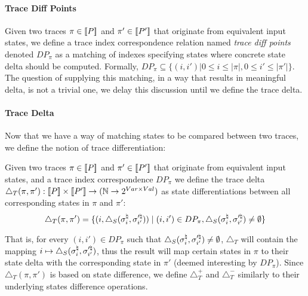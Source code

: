 
\paragraph{Trace Diff Points} 
Given two traces $\pi \in \lbrack\!\lbrack P \rbrack\!\rbrack$ and $\pi' \in \lbrack\!\lbrack P' \rbrack\!\rbrack$ that originate from equivalent input states, we define a trace index correspondence relation named \emph{trace diff points} denoted $DP_{\pi}$ as a matching of indexes specifying states where concrete state delta should be computed. Formally,
$DP_{\pi} \subseteq \{(i,i')| 0 \leq i \leq |\pi|, 0 \leq i' \leq |\pi'|\}$. The question of supplying this matching, in a way that results in meaningful delta, is not a trivial one, we delay this discussion until we define the trace delta.

\paragraph{Trace Delta}
Now that we have a way of matching states to be compared between two traces, we define the notion of trace differentiation:
\begin{definition}
Given two traces $\pi \in \lbrack\!\lbrack P \rbrack\!\rbrack$ and $\pi' \in \lbrack\!\lbrack P' \rbrack\!\rbrack$ that originate from equivalent input states, and a trace index correspondence $DP_{\pi}$ we define the trace delta $\triangle_{T}(\pi,\pi') : \lbrack\!\lbrack P \rbrack\!\rbrack \times \lbrack\!\lbrack P' \rbrack\!\rbrack \rightarrow (\mathbb{N} \rightarrow 2^{Var \times Val})$ as state differentiations between all corresponding states in $\pi$ and $\pi'$:
\[
\triangle_{T}(\pi,\pi') = \{ (i,\triangle_{S}(\sigma^\natural_{i},\sigma'^\natural_{i'})) \mid (i,i') \in DP_{\pi}, \triangle_{S}(\sigma^\natural_{i},\sigma'^\natural_{i'}) \neq \emptyset \}
\]
\end{definition}
That is, for every $(i,i') \in DP_{\pi}$ such that $\triangle_{S}(\sigma^\natural_{i},\sigma'^\natural_{i'}) \neq \emptyset$, $\triangle_{T}$ will contain the mapping $i \mapsto \triangle_{S}(\sigma^\natural_{i},\sigma'^\natural_{i'})$, thus the result will map certain states in $\pi$ to their state delta with the corresponding state in $\pi'$ (deemed interesting by $DP_{\pi}$). Since $\triangle_{T}(\pi,\pi')$ is based on state difference, we define $\triangle_{T}^{+}$ and $\triangle_{T}^{-}$ similarly to their underlying states difference operations.


